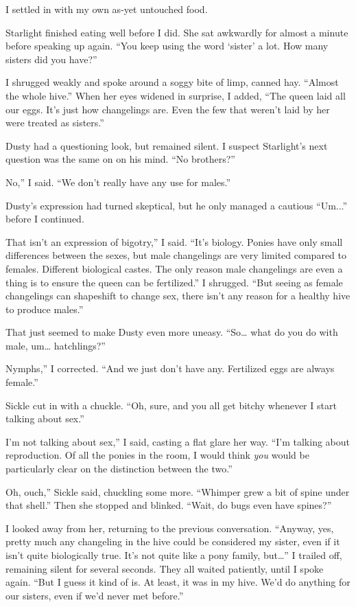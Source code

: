 I settled in with my own as-yet untouched food.

Starlight finished eating well before I did. She sat awkwardly for almost a minute before speaking up again. “You keep using the word ‘sister’ a lot. How many sisters did you have?”

I shrugged weakly and spoke around a soggy bite of limp, canned hay. “Almost the whole hive.” When her eyes widened in surprise, I added, “The queen laid all our eggs. It’s just how changelings are. Even the few that weren’t laid by her were treated as sisters.”

Dusty had a questioning look, but remained silent. I suspect Starlight’s next question was the same on on his mind. “No brothers?”

\leavevmode{}No,” I said. “We don’t really have any use for males.”

Dusty’s expression had turned skeptical, but he only managed a cautious “Um...” before I continued.

\leavevmode{}That isn’t an expression of bigotry,” I said. “It’s biology. Ponies have only small differences between the sexes, but male changelings are very limited compared to females. Different biological castes. The only reason male changelings are even a thing is to ensure the queen can be fertilized.” I shrugged. “But seeing as female changelings can shapeshift to change sex, there isn’t any reason for a healthy hive to produce males.”

That just seemed to make Dusty even more uneasy. “So… what do you do with male, um… hatchlings?”

\leavevmode{}Nymphs,” I corrected. “And we just don’t have any. Fertilized eggs are always female.”

Sickle cut in with a chuckle. “Oh, sure, and you all get bitchy whenever I start talking about sex.”

\leavevmode{}I’m not talking about sex,” I said, casting a flat glare her way. “I’m talking about reproduction. Of all the ponies in the room, I would think \textit{you} would be particularly clear on the distinction between the two.”

\leavevmode{}Oh, ouch,” Sickle said, chuckling some more. “Whimper grew a bit of spine under that shell.” Then she stopped and blinked. “Wait, do bugs even have spines?”

I looked away from her, returning to the previous conversation. “Anyway, yes, pretty much any changeling in the hive could be considered my sister, even if it isn’t quite biologically true. It’s not quite like a pony family, but…” I trailed off, remaining silent for several seconds. They all waited patiently, until I spoke again. “But I guess it kind of is. At least, it was in my hive. We’d do anything for our sisters, even if we’d never met before.”

